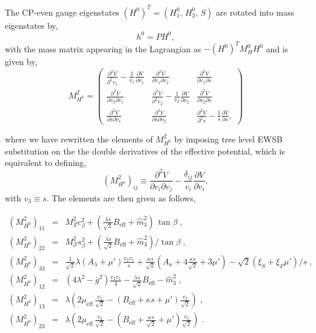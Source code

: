 \documentclass[final,3p,times,pdflatex]{elsarticle}
\newcommand{\nn}{\nonumber}
\newcommand{\be}{\begin{equation}}
\newcommand{\ee}{\end{equation}}
\newcommand{\ba}{\begin{eqnarray}}
\newcommand{\ea}{\end{eqnarray}}
\newcommand{\ds}{\displaystyle}
\begin{document}
The CP-even gauge eigenstates $(H^0)^T = (H_1^0,\, H_2^0, \, S)$ are rotated into mass eigenstates by,
\be h^0 = P H^0, \ee with the mass matrix appearing in the Lagrangian as  $-(H^0)^T M_H^0 H^0$ and is given by,
\be
M_{H^0}^2=
\left(
\begin{array}{ccc}
\ds\frac{\partial^2 V}{\partial^2 v_1 } - \ds\frac{1}{v_1}\frac{\partial V}{\partial v_1}&
\ds\frac{\partial^2 V}{\partial v_1 \partial v_2}&
\ds\frac{\partial^2 V}{\partial v_1 \partial s}\\[0.3cm]
\ds\frac{\partial^2 V}{\partial v_2 \partial v_1}&
\ds\frac{\partial^2 V}{\partial^2 v_2} - \ds\frac{1}{v_2}\frac{\partial V}{\partial v_2}&
\ds\frac{\partial^2 V}{\partial v_2 \partial s}\\[0.3cm]
\ds\frac{\partial^2 V}{\partial s \partial v_1}&
\ds\frac{\partial^2 V}{\partial s \partial v_2}&
\ds\frac{\partial^2 V}{\partial^2 s} - \ds\frac{1}{s}\frac{\partial V}{\partial s},
\end{array} 
\right)
 \ee

where we have rewritten the elements of $M_{H^0}^2$ by imposing tree level EWSB substitution on the the double derivatives of the effective potential, which is equivalent to defining,  \be(M_{H^0}^2)_{ij} \equiv  \ds\frac{\partial^2 V}{\partial v_i \partial v_j} - \ds\frac{\delta_{ij}}{v_i}\frac{\partial V}{\partial v_i}, \ee with $v_3 \equiv s$.  The elements are then given as follows,   

\ba
 (M_{H^0}^2)_{11} & = & M_Z^2 c_\beta^2 + (\ds\frac{\lambda s}{\sqrt{2}} B_\textrm{eff} +
\widehat{m}_3^2)\,\tan\beta\;, \nn\\
 (M_{H^0}^2)_{22} & = & M_Z^2 s_\beta^2 + (\ds\frac{\lambda s}{\sqrt{2}} B_\textrm{eff} +
\widehat{m}_3^2)/\tan\beta\;, \nn\\
 (M_{H^0}^2)_{33} & = & \ds\frac{1}{\sqrt{2}}\lambda (A_\lambda + \mu') \frac{v_2 v_1}{s}
+ \frac{\kappa s}{\sqrt{2}} (A_\kappa + 4\frac{\kappa s}{\sqrt{2}}+ 3 \mu') - \sqrt{2}(\xi_S + \xi_F \mu')/s\;, \nn\\
 (M_{H^0}^2)_{12} & = & (4\lambda^2 - \bar{g}^2) \frac{v_2 v_1 }{4}- 
\ds\frac{\lambda s}{\sqrt{2}} B_\textrm{eff} - \widehat{m}_3^2 \;, \nn\\ 
 (M_{H^0}^2)_{13} & = & \lambda (2 \mu_\textrm{eff}\,\frac{ v_1}{\sqrt{2}} -
(B_\textrm{eff} + \kappa s + \mu')\frac{ v_2}{\sqrt{2}})\;, \nn\\
 (M_{H^0}^2)_{23} & = & \lambda (2 \mu_\textrm{eff}\, \frac{ v_2}{\sqrt{2}} -
(B_\textrm{eff} + \frac{\kappa s}{\sqrt{2}} + \mu')\frac{ v_1}{\sqrt{2}})\;.
\label{2.22e}
\ea
\end{document}
